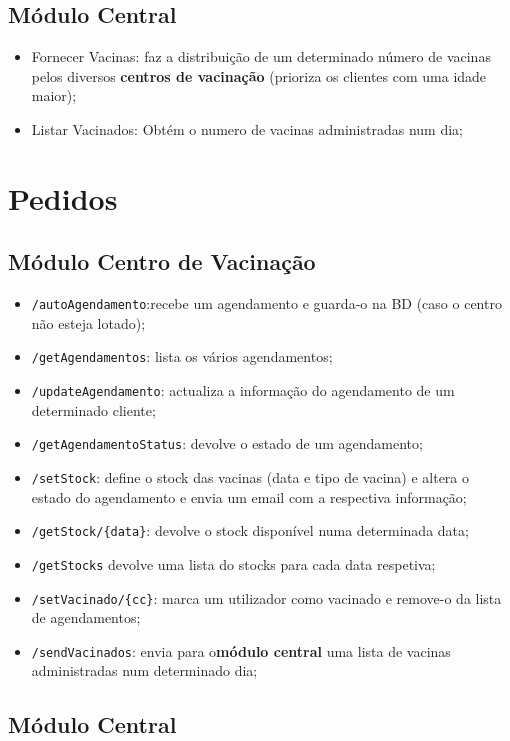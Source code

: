 \documentclass[11pt]{article}
\begin{document}
\subsection{Módulo Central}

\begin{itemize}
    \item Fornecer Vacinas: faz a distribuição de um determinado número de vacinas pelos diversos \textbf{centros de vacinação} (prioriza os clientes com uma idade maior);
    \item Listar Vacinados: Obtém o numero de vacinas administradas num dia;
\end{itemize}


\section{Pedidos}
\subsection{Módulo Centro de Vacinação} 

\begin{itemize}
    \item \verb|/autoAgendamento|:recebe um agendamento e guarda-o na BD (caso o centro não esteja lotado);
    \item \verb|/getAgendamentos|: lista os vários agendamentos;
    \item \verb|/updateAgendamento|: actualiza a informação do agendamento de um determinado cliente;
    \item \verb|/getAgendamentoStatus|: devolve o estado de um agendamento;  
    \item \verb|/setStock|: define o stock das vacinas (data e tipo de vacina) e altera o estado do agendamento e envia um email com a respectiva informação;
    \item \verb|/getStock/{data}|: devolve o stock disponível numa determinada data;
    \item \verb|/getStocks| devolve uma lista do stocks para cada data respetiva;
    \item \verb|/setVacinado/{cc}|: marca um utilizador como vacinado e remove-o da lista de agendamentos;
    \item \verb|/sendVacinados|: envia para o\textbf{módulo central} uma lista de vacinas administradas num determinado dia;
\end{itemize}

\subsection{Módulo Central}
\end{document}
